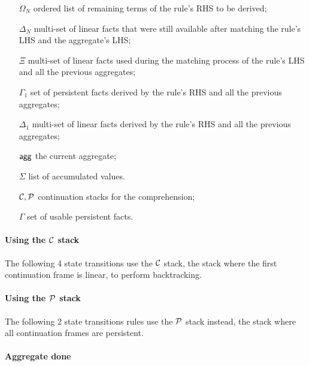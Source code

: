 \begin{enumerate}

   \item[$\Omega_N$] ordered list of remaining terms of the rule's RHS to be
      derived;

   \item[$\Delta_N$] multi-set of linear facts that were still available after
   matching the rule's LHS and the aggregate's LHS;
   \item[$\Xi$] multi-set of linear facts used during the matching process of
   the rule's LHS and all the previous aggregates;

   \item[$\Gamma_{1}$] set of persistent facts derived by the rule's RHS and all
      the previous aggregates;

   \item[$\Delta_{1}$] multi-set of linear facts derived by the rule's RHS and
      all the previous aggregates;

   \item[$\mathsf{agg}$] the current aggregate;
   \item[$\Sigma$] list of accumulated values.
   \item[$\mathcal{C}, \mathcal{P}$] continuation stacks for the comprehension;
   \item[$\Gamma$] set of usable persistent facts.
\end{enumerate}

\paragraph{Using the $\mathcal{C}$ stack}

The following 4 state transitions use the $\mathcal{C}$ stack, the stack where the
first continuation frame is linear, to perform backtracking.



\paragraph{Using the $\mathcal{P}$ stack}

The following 2 state transitions rules use the $\mathcal{P}$ stack instead, the stack where all
continuation frames are persistent.



\paragraph{Aggregate done}

